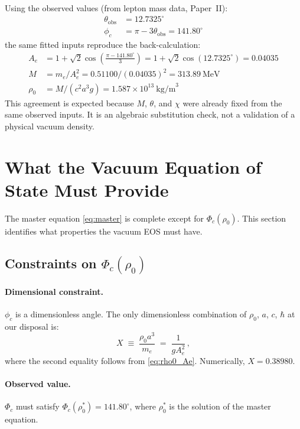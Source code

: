 \documentclass[11pt]{article}
\begin{document}
Using the observed values (from lepton mass data, Paper~II):
\begin{align}
  \theta_\text{obs} &= 12.7325^\circ \label{eq:theta_obs} \\
  \phi_c            &= \pi - 3\theta_\text{obs} = 141.80^\circ \label{eq:phi_c_obs}
\end{align}
the same fitted inputs reproduce the back-calculation:
\begin{align}
  A_e &= 1 + \sqrt{2}\cos\!\left(\frac{\pi - 141.80^\circ}{3}\right)
         = 1 + \sqrt{2}\cos(12.7325^\circ)
         = 0.04035 \label{eq:Ae_val} \\
  M   &= m_e / A_e^2 = 0.51100 / (0.04035)^2 = 313.89~\text{MeV}
         \label{eq:M_val} \\
  \rho_0 &= M / (c^2 a^3 g) = 1.587 \times 10^{13}~\text{kg/m}^3
         \label{eq:rho0_val}
\end{align}
This agreement is expected because $M$, $\theta$, and $\chi$ were already fixed
from the same observed inputs. It is an algebraic substitution check, not a
validation of a physical vacuum density.


\section{What the Vacuum Equation of State Must Provide}
\label{sec:eos}

The master equation \eqref{eq:master} is complete except for $\Phi_c(\rho_0)$.
This section identifies what properties the vacuum EOS must have.

\subsection{Constraints on $\Phi_c(\rho_0)$}

\paragraph{Dimensional constraint.}
$\phi_c$ is a dimensionless angle.
The only dimensionless combination of $\rho_0$, $a$, $c$, $\hbar$ at our
disposal is:
\begin{equation}
  X \;\equiv\; \frac{\rho_0 a^3}{m_e} \;=\; \frac{1}{g A_e^2}\,,
  \label{eq:X}
\end{equation}
where the second equality follows from \eqref{eq:rho0_Ae}.
Numerically, $X = 0.38980$.

\paragraph{Observed value.}
$\Phi_c$ must satisfy $\Phi_c(\rho_0^*) = 141.80^\circ$, where $\rho_0^*$
is the solution of the master equation.
\end{document}

